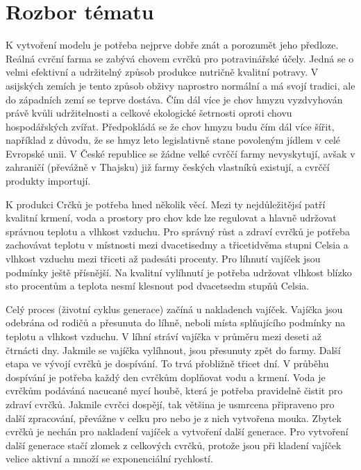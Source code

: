 \documentclass[a4paper, 12pt]{article}
\begin{document}
\section{Rozbor tématu}
K vytvoření modelu je potřeba nejprve dobře znát a porozumět jeho předloze. Reálná cvrční farma se zabývá chovem cvrčků pro potravinářské účely. Jedná se o velmi efektivní a udržitelný způsob produkce nutričně kvalitní potravy. V asijských zemích je tento způsob obživy naprostro normální a má svojí tradici, ale do západních zemí se teprve dostáva. Čím dál více je chov hmyzu vyzdvyhován právě kvůli udržitelnosti a celkové ekologické šetrnosti oproti chovu hospodářských zvířat. Předpokládá se že chov hmyzu budu čím dál více šířit, například z důvodu, že se hmyz leto legislativně stane povoleným jídlem v celé Evropské unii. V České republice se žádne velké cvrččí farmy nevyskytují, avšak v zahraničí (převážně v Thajsku) již farmy českých vlastníků existují, a cvrččí produkty importují. 

K produkci Crčků je potřeba hned několik věcí. Mezi ty nejdůležitějsí patří kvalitní krmení, voda a prostory pro chov kde lze regulovat a hlavně udržovat správnou teplotu a vlhkost vzduchu. Pro správný růst a zdraví cvrčků je potřeba zachovávat teplotu v místnosti mezi dvacetisedmy a třicetidvěma stupni Celsia a vlhkost vzduchu mezi třiceti až padesáti procenty. Pro líhnutí vajíček jsou podmínky ještě přísnější. Na kvalitní vylíhnutí je potřeba udržovat vlhkost blízko sto procentům a teplota nesmí klesnout pod dvacetsedm stupňů Celsia. 

Celý proces (životní cyklus generace) začíná u nakladench vajíček. Vajíčka jsou odebrána od rodičů a přesunuta do líhně, neboli místa splňujícího podmínky na teplotu a vlhkost vzduchu. V líhní stráví vajíčka v průměru mezi deseti až čtrnácti dny. Jakmile se vajíčka vylíhnout, jsou přesunuty zpět do farmy. Další etapa ve vývojí cvrčků je dospívání. To trvá přobližně třicet dní. V průběhu dospívání je potřeba každý den cvrčkům doplňovat vodu a krmení. Voda je cvrčkům podáváná nacucané mycí houbě, která je potřeba pravidelně čistit pro zdraví cvrčků. Jakmile cvrčci dospějí, tak většina je usmrcena připraveno pro další zpracování, převážne v celku pro nebo je z nich vytvořena mouka. Zbytek cvrčků je nechán pro nakladení vajíček a vytvoření další generace. Pro vytvoření další generace stačí zlomek z celkových cvrčků, protože jsou při kladení vajíček velice aktivní a množí se exponenciální rychlostí. 

\newpage
\end{document}
